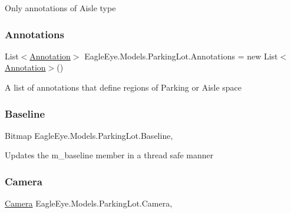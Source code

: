 Only annotations of Aisle type 

\mbox{\label{class_eagle_eye_1_1_models_1_1_parking_lot_a8a80d92c49b0671de35a6649411a8593}} 
\subsubsection{\texorpdfstring{Annotations}{Annotations}}
{\footnotesize\ttfamily List$<$\mbox{\hyperlink{class_eagle_eye_1_1_models_1_1_annotation}{Annotation}}$>$ Eagle\+Eye.\+Models.\+Parking\+Lot.\+Annotations = new List$<$\mbox{\hyperlink{class_eagle_eye_1_1_models_1_1_annotation}{Annotation}}$>$()\hspace{0.3cm}{\ttfamily [get]}}



A list of annotations that define regions of Parking or Aisle space 

\mbox{\label{class_eagle_eye_1_1_models_1_1_parking_lot_a1084b858315b2b9c303ec35dca58fe74}} 
\subsubsection{\texorpdfstring{Baseline}{Baseline}}
{\footnotesize\ttfamily Bitmap Eagle\+Eye.\+Models.\+Parking\+Lot.\+Baseline\hspace{0.3cm}{\ttfamily [get]}, {\ttfamily [set]}}



Updates the m\+\_\+baseline member in a thread safe manner 

\mbox{\label{class_eagle_eye_1_1_models_1_1_parking_lot_acc11c12c8ab93ee8fa96894f20df38b3}} 
\subsubsection{\texorpdfstring{Camera}{Camera}}
{\footnotesize\ttfamily \mbox{\hyperlink{class_eagle_eye_1_1_models_1_1_camera}{Camera}} Eagle\+Eye.\+Models.\+Parking\+Lot.\+Camera\hspace{0.3cm}{\ttfamily [get]}, {\ttfamily [set]}}



